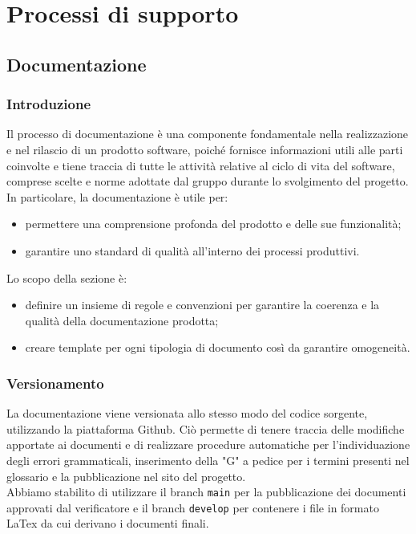 \section{Processi di supporto}
\subsection{Documentazione}
\subsubsection{Introduzione}
Il processo di documentazione è una componente fondamentale nella realizzazione e nel rilascio di un prodotto software,
poiché fornisce informazioni utili alle parti coinvolte e tiene traccia di tutte le attività relative al ciclo di vita del software,
comprese scelte e norme adottate dal gruppo durante lo svolgimento del progetto. In particolare, la documentazione è utile per:
\begin{itemize}
	\item permettere una comprensione profonda del prodotto e delle sue funzionalità;
	\item garantire uno standard di qualità all'interno dei processi produttivi.
\end{itemize}
Lo scopo della sezione è:
\begin{itemize}
	\item definire un insieme di regole e convenzioni per garantire la coerenza e la qualità della documentazione prodotta;
	\item creare template per ogni tipologia di documento così da garantire omogeneità.
\end{itemize}

\subsubsection{Versionamento}
La documentazione viene versionata allo stesso modo del codice sorgente, utilizzando la piattaforma Github.
Ciò permette di tenere traccia delle modifiche apportate ai documenti e di realizzare procedure automatiche per l'individuazione degli errori grammaticali,
inserimento della "G" a pedice per i termini presenti nel glossario e la pubblicazione nel sito del progetto.\\
Abbiamo stabilito di utilizzare il branch \texttt{main} per la pubblicazione dei documenti approvati dal verificatore e il branch \texttt{develop} per contenere
i file in formato LaTex da cui derivano i documenti finali.

